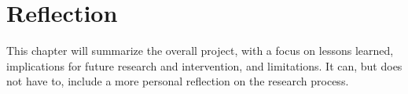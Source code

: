 \chapter{Reflection	}

This chapter will  summarize the overall project, with a focus on lessons learned, implications for future research and intervention, and limitations. It can, but does not have to, include a more personal reflection on the research process. 


